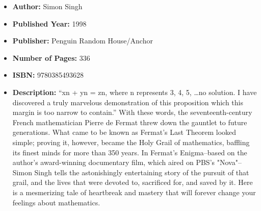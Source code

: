 \documentclass{tufte-handout}
\begin{document}
\begin{itemize}
    \item[] \textbf{Author:} Simon Singh
    \item[] \textbf{Published Year:} 1998 
    \item[] \textbf{Publisher:} Penguin Random House/Anchor
    \item[] \textbf{Number of Pages:} 336      
    \item[] \textbf{ISBN:} 9780385493628
    \item[] \textbf{Description:} ``xn + yn = zn, where n represents 3, 4, 5, \ldots no solution. I have discovered a truly marvelous demonstration of this proposition which this margin is too narrow to contain.'' With these words, the seventeenth-century French mathematician Pierre de Fermat threw down the gauntlet to future generations. What came to be known as Fermat’s Last Theorem looked simple; proving it, however, became the Holy Grail of mathematics, baffling its finest minds for more than 350 years. In Fermat’s Enigma–based on the author’s award-winning documentary film, which aired on PBS’s "Nova"–Simon Singh tells the astonishingly entertaining story of the pursuit of that grail, and the lives that were devoted to, sacrificed for, and saved by it. Here is a mesmerizing tale of heartbreak and mastery that will forever change your feelings about mathematics.
\end{itemize}
\end{document}
